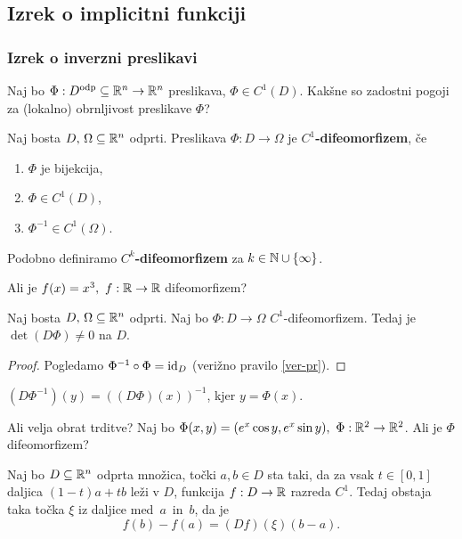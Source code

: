 \subsection{Izrek o implicitni funkciji}
\subsubsection{Izrek o inverzni preslikavi}
Naj bo $\Phi: D^\text{odp} \subseteq \mathbb{R}^n \to \mathbb{R}^n$ preslikava, $\Phi \in C^1(D)$. Kakšne so zadostni pogoji za (lokalno) obrnljivost preslikave $\Phi$?
\begin{definicija}
    Naj bosta $D, \, \Omega \subseteq \mathbb{R}^n$ odprti. Preslikava $\Phi: D  \to \Omega$ je \textbf{$C^1$-difeomor\-fizem}, če
    \begin{enumerate}
        \item $\Phi$ je bijekcija, 
        \item $\Phi \in C^1(D)$,
        \item $\Phi^{-1} \in C^1(\Omega)$.
    \end{enumerate} 
    Podobno definiramo \textbf{$C^k$-difeomorfizem} za $k \in \mathbb{N} \cup \{\infty\}$.
\end{definicija}

\begin{zgled}
    Ali je $f(x) = x^3, \ f: \mathbb{R} \to \mathbb{R}$ difeomorfizem?
\end{zgled}

\begin{trditev}
    Naj bosta $D, \, \Omega \subseteq \mathbb{R}^n$ odprti. Naj bo $\Phi: D  \to \Omega$ $C^1$-difeomorfizem. Tedaj je $\det(D\Phi) \neq 0$ na $D$. 
\end{trditev}

\begin{proof}
    Pogledamo $\Phi^{-1} \circ \Phi = \operatorname{id}_D$ (verižno pravilo \ref{ver-pr}).
\end{proof}

\begin{posledica}
    $(D\Phi^{-1})(y) = ((D\Phi)(x))^{-1}$, kjer $y = \Phi(x)$.
\end{posledica}

\begin{zgled}
    Ali velja obrat trditve? 
    Naj bo $\Phi(x,y) = (e^x \cos y, e^x \sin y), \ \Phi: \mathbb{R}^2 \to \mathbb{R}^2$. Ali je $\Phi$ difeomorfizem?
\end{zgled}

\begin{lema}
    \label{lagr-many-var}
    Naj bo $D \subseteq \mathbb{R}^n$ odprta množica, točki $a, b \in D$ sta taki, da za vsak $t \in [0,1]$ daljica $(1-t)a + tb$ leži v $D$, funkcija $f: D \to \mathbb{R}$ razreda $C^1$.     
    Tedaj obstaja taka točka $\xi$ iz daljice med~$a$~in~$b$, da je 
    $$f(b)-f(a) = (Df)(\xi)(b-a).$$
\end{lema}

